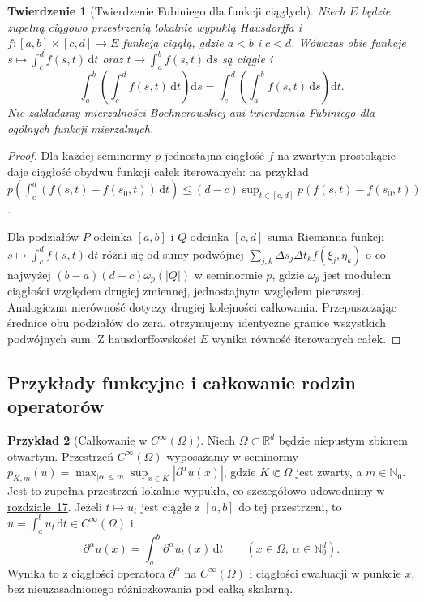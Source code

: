 \documentclass[11pt,a4paper]{article}
\numberwithin{equation}{section}
\theoremstyle{plain}
\newtheorem{twierdzenie}{Twierdzenie}[section]
\theoremstyle{definition}
\newtheorem{przyklad}[twierdzenie]{Przykład}
\theoremstyle{remark}
\newcommand{\R}{\mathbb R}
\newcommand{\N}{\mathbb N}
\begin{document}
\begin{twierdzenie}[Twierdzenie Fubiniego dla funkcji ciągłych]
\label{thm:fubini-continuous15a}
Niech $E$ będzie zupełną ciągowo przestrzenią lokalnie wypukłą
Hausdorffa i $f:[a,b]\times[c,d]\to E$ funkcją ciągłą,
gdzie $a<b$ i $c<d$. Wówczas obie funkcje
$s\mapsto\int_c^d f(s,t)\,\mathrm dt$ oraz
$t\mapsto\int_a^b f(s,t)\,\mathrm ds$ są ciągłe i
\[
 \int_a^b\left(\int_c^d f(s,t)\,\mathrm dt\right)\mathrm ds
 =\int_c^d\left(\int_a^b f(s,t)\,\mathrm ds\right)\mathrm dt.
\]
Nie zakładamy mierzalności Bochnerowskiej ani twierdzenia Fubiniego
dla ogólnych funkcji mierzalnych.
\end{twierdzenie}
\begin{proof}
Dla każdej seminormy $p$ jednostajna ciągłość $f$
na zwartym prostokącie daje ciągłość obydwu funkcji
całek iterowanych: na przykład
$p(\int_c^d(f(s,t)-f(s_0,t))\,\mathrm dt)
\le(d-c)\sup_{t\in[c,d]}p(f(s,t)-f(s_0,t))$.

Dla podziałów $P$ odcinka $[a,b]$ i $Q$ odcinka $[c,d]$
suma Riemanna funkcji
$s\mapsto\int_c^d f(s,t)\,\mathrm dt$ różni się od sumy
podwójnej $\sum_{j,k}\Delta s_j\Delta t_k f(\xi_j,\eta_k)$
o co najwyżej $(b-a)(d-c)\omega_p(|Q|)$ w seminormie $p$,
gdzie $\omega_p$ jest modułem ciągłości względem drugiej
zmiennej, jednostajnym względem pierwszej. Analogiczna
nierówność dotyczy drugiej kolejności całkowania.
Przepuszczając średnice obu podziałów do zera, otrzymujemy
identyczne granice wszystkich podwójnych sum. Z
hausdorffowskości $E$ wynika równość iterowanych całek.
\end{proof}

\subsection{Przykłady funkcyjne i całkowanie rodzin operatorów}

\begin{przyklad}[Całkowanie w $C^\infty(\Omega)$]
\label{ex:c-infty-integral15a}
Niech $\Omega\subset\R^d$ będzie niepustym zbiorem otwartym.
Przestrzeń $C^\infty(\Omega)$ wyposażamy w seminormy
$p_{K,m}(u)=\max_{|\alpha|\le m}\sup_{x\in K}|\partial^\alpha u(x)|$,
gdzie $K\Subset\Omega$ jest zwarty, a $m\in\N_0$.
Jest to zupełna przestrzeń lokalnie wypukła, co szczegółowo
udowodnimy w \hyperref[sec:gladkie-schwartz17]{rozdziale~17}. Jeżeli $t\mapsto u_t$ jest
ciągłe z $[a,b]$ do tej przestrzeni, to
$u=\int_a^b u_t\,\mathrm dt\in C^\infty(\Omega)$ i
\[
 \partial^\alpha u(x)
 =\int_a^b\partial^\alpha u_t(x)\,\mathrm dt
 \qquad(x\in\Omega,\ \alpha\in\N_0^d).
\]
Wynika to z ciągłości operatora $\partial^\alpha$ na
$C^\infty(\Omega)$ i ciągłości ewaluacji w punkcie $x$,
bez nieuzasadnionego różniczkowania pod całką skalarną.
\end{przyklad}
\end{document}
